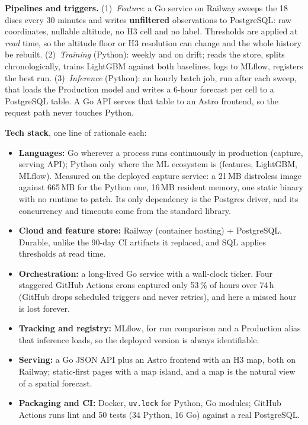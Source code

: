\documentclass[10pt,a4paper]{article}
\newcommand{\code}[1]{\texttt{#1}}
\begin{document}
\textbf{Pipelines and triggers.} (1)~\emph{Feature}: a Go service on Railway sweeps the 18
discs every 30 minutes and writes \textbf{unfiltered} observations to PostgreSQL: raw
coordinates, nullable altitude, no H3 cell and no label. Thresholds are applied at
\emph{read} time, so the altitude floor or H3 resolution can change and the whole history be
rebuilt. (2)~\emph{Training} (Python): weekly and on drift; reads the store, splits
chronologically, trains LightGBM against both baselines, logs to MLflow, registers the best
run. (3)~\emph{Inference} (Python): an hourly batch job, run after each sweep, that loads the
Production model and writes a 6-hour forecast per cell to a PostgreSQL table. A Go API serves
that table to an Astro frontend, so the request path never touches Python.

\textbf{Tech stack}, one line of rationale each:
\begin{itemize}
  \item \textbf{Languages:} Go wherever a process runs continuously in production (capture,
        serving API); Python only where the ML ecosystem is (features, LightGBM, MLflow).
        Measured on the deployed capture service: a 21\,MB distroless image against 665\,MB
        for the Python one, 16\,MB resident memory, one static binary with no runtime to
        patch. Its only dependency is the Postgres driver, and its concurrency and timeouts
        come from the standard library.
  \item \textbf{Cloud and feature store:} Railway (container hosting) + PostgreSQL. Durable,
        unlike the 90-day CI artifacts it replaced, and SQL applies thresholds at read time.
  \item \textbf{Orchestration:} a long-lived Go service with a wall-clock ticker. Four
        staggered GitHub Actions crons captured only 53\,\% of hours over 74\,h (GitHub
        drops scheduled triggers and never retries), and here a missed hour is lost forever.
  \item \textbf{Tracking and registry:} MLflow, for run comparison and a Production alias
        that inference loads, so the deployed version is always identifiable.
  \item \textbf{Serving:} a Go JSON API plus an Astro frontend with an H3 map, both on
        Railway; static-first pages with a map island, and a map is the natural view of a
        spatial forecast.
  \item \textbf{Packaging and CI:} Docker, \code{uv.lock} for Python, Go modules; GitHub
        Actions runs lint and 50 tests (34 Python, 16 Go) against a real PostgreSQL.
\end{itemize}
\end{document}
